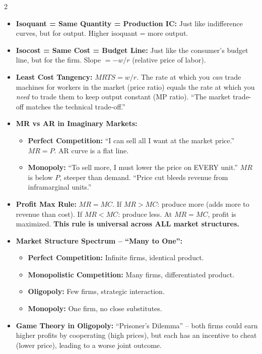 \documentclass[10pt,a4paper]{article}
\begin{document}
\begin{multicols}{2}
\begin{itemize}[leftmargin=*,nosep]
    \item \textbf{Isoquant = Same Quantity = Production IC:} Just like indifference curves, but for output. Higher isoquant = more output.
    \item \textbf{Isocost = Same Cost = Budget Line:} Just like the consumer's budget line, but for the firm. Slope $= -w/r$ (relative price of labor).
    \item \textbf{Least Cost Tangency:} $MRTS = w/r$. The rate at which you \textit{can} trade machines for workers in the market (price ratio) equals the rate at which you \textit{need} to trade them to keep output constant (MP ratio). ``The market trade-off matches the technical trade-off.''
    \item \textbf{MR vs AR in Imaginary Markets:}
    \begin{itemize}[nosep]
        \item \textbf{Perfect Competition:} ``I can sell all I want at the market price.'' $MR = P$. AR curve is a flat line.
        \item \textbf{Monopoly:} ``To sell more, I must lower the price on EVERY unit.'' $MR$ is below $P$, steeper than demand. ``Price cut bleeds revenue from inframarginal units.''
    \end{itemize}
    \item \textbf{Profit Max Rule:} $MR = MC$. If $MR > MC$: produce more (adds more to revenue than cost). If $MR < MC$: produce less. At $MR = MC$, profit is maximized. \textbf{This rule is universal across ALL market structures.}
    \item \textbf{Market Structure Spectrum -- ``Many to One'':}
    \begin{itemize}[nosep]
        \item \textbf{Perfect Competition:} Infinite firms, identical product.
        \item \textbf{Monopolistic Competition:} Many firms, differentiated product.
        \item \textbf{Oligopoly:} Few firms, strategic interaction.
        \item \textbf{Monopoly:} One firm, no close substitutes.
    \end{itemize}
    \item \textbf{Game Theory in Oligopoly:} ``Prisoner's Dilemma'' -- both firms could earn higher profits by cooperating (high prices), but each has an incentive to cheat (lower price), leading to a worse joint outcome.
\end{itemize}


\end{multicols}
\end{document}
